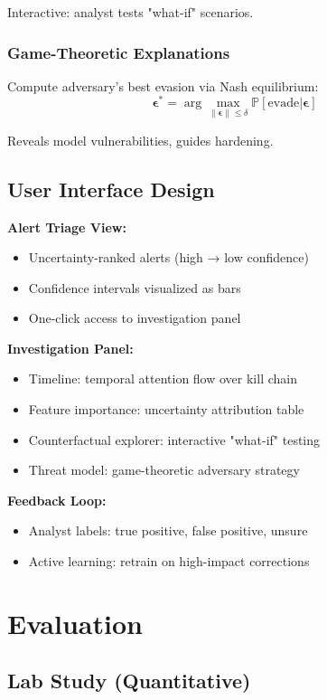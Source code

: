 \documentclass[letterpaper,twocolumn,10pt]{article}
\begin{document}
Interactive: analyst tests "what-if" scenarios.

\subsubsection{Game-Theoretic Explanations}
Compute adversary's best evasion via Nash equilibrium:
\begin{equation}
\boldsymbol{\epsilon}^* = \arg\max_{\|\boldsymbol{\epsilon}\| \leq \delta} \mathbb{P}[\text{evade} | \boldsymbol{\epsilon}]
\end{equation}

Reveals model vulnerabilities, guides hardening.

\subsection{User Interface Design}

\textbf{Alert Triage View:}
\begin{itemize}
\item Uncertainty-ranked alerts (high → low confidence)
\item Confidence intervals visualized as bars
\item One-click access to investigation panel
\end{itemize}

\textbf{Investigation Panel:}
\begin{itemize}
\item Timeline: temporal attention flow over kill chain
\item Feature importance: uncertainty attribution table
\item Counterfactual explorer: interactive "what-if" testing
\item Threat model: game-theoretic adversary strategy
\end{itemize}

\textbf{Feedback Loop:}
\begin{itemize}
\item Analyst labels: true positive, false positive, unsure
\item Active learning: retrain on high-impact corrections
\end{itemize}

\section{Evaluation}

\subsection{Lab Study (Quantitative)}
\end{document}

